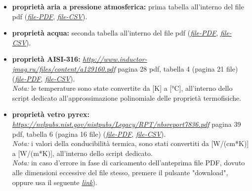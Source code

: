 \documentclass[a4paper,10pt]{article}                                                                                       %
\begin{document}
  \begin{itemize}                                                                                                           %
    \item \textbf{proprietà aria a pressione atmosferica:}
      prima tabella all'interno del file pdf
      (\textit{\href{https://github.com/CristianMerli/DataAnalysis/blob/master/lab_doc/TabelleAriaAcqua.pdf}{file-PDF}},
      \textit{\href{https://github.com/CristianMerli/DataAnalysis/blob/master/data_analysis/thermophys_vars/air_atmp_thermo_vars.csv}{file-CSV}}).
    \item \textbf{proprietà acqua:}
      seconda tabella all'interno del file pdf
      (\textit{\href{https://github.com/CristianMerli/DataAnalysis/blob/master/lab_doc/TabelleAriaAcqua.pdf}{file-PDF}},
      \textit{\href{https://github.com/CristianMerli/DataAnalysis/blob/master/data_analysis/thermophys_vars/water_thermo_vars.csv}{file-CSV}}).
    \item \textbf{proprietà AISI-316:}
      \textit{\href{http://www.inductor-jmag.ru/files/content/a129160.pdf}{http://www.inductor-jmag.ru/files/content/a129160.pdf}}
      pagina 28 pdf, tabella 4 (pagina 21 file)
      (\textit{\href{https://github.com/CristianMerli/DataAnalysis/blob/master/lab_doc/AISI316.pdf}{file-PDF}},
      \textit{\href{https://github.com/CristianMerli/DataAnalysis/blob/master/data_analysis/thermophys_vars/aisi_316_thermo_vars.csv}{file-CSV}}).
      \vspace{1.5mm}\\\textit{Nota:} le temperature sono state convertite da [K] a [°C], all'interno dello script dedicato
      all'approssimazione polinomiale delle proprietà termofisiche.
    \item \textbf{proprietà vetro pyrex:}
      \textit{\href{https://nvlpubs.nist.gov/nistpubs/Legacy/RPT/nbsreport7836.pdf}{https://nvlpubs.nist.gov/nistpubs/Legacy/RPT/nbsreport7836.pdf}}
      pagina 39 pdf, tabella 6 (pagina 16 file)
      (\textit{\href{https://github.com/CristianMerli/DataAnalysis/blob/master/lab_doc/Pyrex_glass.pdf}{file-PDF}},
      \textit{\href{https://github.com/CristianMerli/DataAnalysis/blob/master/data_analysis/thermophys_vars/pyrex_glass_thermo_vars.csv}{file-CSV}}).
      \vspace{1.5mm}\\\textit{Nota:} i valori della conducibilità termica, sono stati convertiti da [W/(cm*K)] a
      [W/(m*K)], all'interno dello script dedicato.
      \vspace{1.5mm}\\\textit{Nota:} in caso d'errore in fase di caricamento dell'anteprima file PDF, dovuto alle
      dimensioni eccessive del file stesso, premere il pulsante "download", oppure usa il seguente
      \textit{\href{https://github.com/CristianMerli/DataAnalysis/raw/master/lab_doc/Pyrex_glass.pdf}{link}}).
  \end{itemize}                                                                                                             %
\end{document}
